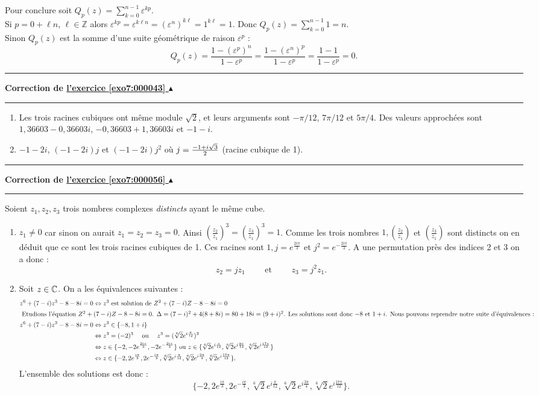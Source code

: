 \documentclass[11pt,a4paper]{article}
\newcommand{\Zz}{\mathbb{Z}} \newcommand{\Z}{\mathbb{Z}}
\renewcommand{\epsilon}{\varepsilon}
\newcounter{exo}
\newcommand{\correction}[1]{\hypertarget{cor7:#1}{}\label{cor7:#1}{\bf Correction de \hyperlink{exo7:#1}{l'exercice \ref{exo7:#1} $\blacktriangle$}}\vspace{1mm}\hrule\vspace{1mm}}
\newcommand{\fincorrection}{\vspace{1mm}\hrule\vspace*{7mm}}
\begin{document}
Pour conclure soit  $Q_p(z) = \sum_{k=0}^{n-1}\epsilon^{kp}$.\\
Si $p = 0 +\ell n$, $\ell \in \Zz$ alors $\epsilon^{kp}=\epsilon^{k\ell n}=(\epsilon^n)^{k \ell}
=1^{k \ell}=1$. Donc $Q_p(z)  = \sum_{k=0}^{n-1} 1 = n$. \\
Sinon $Q_p(z)$ est la somme d'une suite g\'eom\'etrique de raison
$\epsilon^p$ :
$$ Q_p(z) = \frac{1-\left( \epsilon^p \right)^n}{1-\epsilon^p}
= \frac{1-\left( \epsilon^n \right)^p}{1-\epsilon^p} =
\frac{1-1}{1-\epsilon^p}=0.$$
\fincorrection
\correction{000043}
\begin{enumerate}
\item Les trois racines cubiques ont m\^eme module $\sqrt2$, et leurs arguments
sont $-\pi /12$, $7\pi /12$ et $5\pi/4$. Des valeurs approch\'ees sont
$1{,}36603-0{,}36603 i$, $-0{,}36603+1{,}36603 i$ et $-1-i$.
\item $-1-2i$, $(-1-2i)j$ et $(-1-2i)j^2$ o\`u $j={-1+i\sqrt3\over2}$ (racine
cubique de 1).
\end{enumerate}
\fincorrection
\correction{000056}
Soient $z_{1},z_{2},z_{3}$ trois nombres complexes
\emph{distincts} ayant le m\^eme cube.
\begin{enumerate}
\item
$z_{1}\neq0$ car sinon on aurait $z_{1}=z_{2}=z_{3}=0$. Ainsi
$(\frac{z_{2}}{z_{1}})^3=(\frac{z_{3}}{z_{1}})^3=1$. Comme les
trois nombres $1,(\frac{z_{2}}{z_{1}})$ et $(\frac{z_{3}}{z_{1}})$
sont distincts on en d\'eduit que ce sont les trois racines
cubiques de 1. Ces racines sont $1, j=e^{\frac{2i\pi}{3}}$ et $
j^2=e^{-\frac{2i\pi}{3}}$. A une permutation pr\`es des indices 2
et 3 on a donc :
$$
  z_{2}=jz_{1} \qquad\text{ et }\qquad z_{3}=j^2z_{1}.
$$
\item Soit $z\in\mathbb{C}$. On a les \'equivalences suivantes :
\begin{align*}
z^6+(7-i)z^3-8-8i=0 &\Leftrightarrow z^3\text{ est solution de }Z^2+(7-i)Z-8-8i=0\\
\intertext{ Etudions l'\'equation $Z^2+(7-i)Z-8-8i=0$.
$\Delta=(7-i)^2+4(8+8i)=80+18i=(9+i)^2$. Les solutions sont donc
$-8$ et $1+i$. Nous pouvons reprendre notre suite d'\'equivalences
: }
z^6+(7-i)z^3-8-8i=0 &\Leftrightarrow z^3\in\{-8,1+i\} \\
  &\Leftrightarrow z^3=(-2)^3 \quad\text{ ou }\quad z^3=(\sqrt[6]{2}e^{i\frac{\pi}{12}})^3\\
  &\Leftrightarrow z\in\{-2,
              -2e^{\frac{2i\pi}{3}},
              -2e^{-\frac{2i\pi}{3}}\}
         \text{ ou }
        z\in\{\sqrt[6]{2}e^{i\frac{\pi}{12}},
              \sqrt[6]{2}e^{i\frac{9\pi}{12}},
              \sqrt[6]{2}e^{i\frac{17\pi}{12}}\}\\
  &\Leftrightarrow z\in\{-2,
               2e^{\frac{i\pi}{3}},
               2e^{-\frac{i\pi}{3}},
              \sqrt[6]{2}e^{i\frac{\pi}{12}},
              \sqrt[6]{2}e^{i\frac{3\pi}{4}},
              \sqrt[6]{2}e^{i\frac{17\pi}{12}}\}.
\end{align*}
L'ensemble des solutions est donc :
           $$\{-2,
               2e^{\frac{i\pi}{3}},
               2e^{-\frac{i\pi}{3}},
              \sqrt[6]{2}e^{i\frac{\pi}{12}},
              \sqrt[6]{2}e^{i\frac{3\pi}{4}},
              \sqrt[6]{2}e^{i\frac{17\pi}{12}}\}.$$
\end{enumerate}
\end{document}
